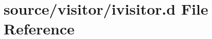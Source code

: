 \hypertarget{ivisitor_8d}{
\section{source/visitor/ivisitor.d File Reference}
\label{ivisitor_8d}
}
